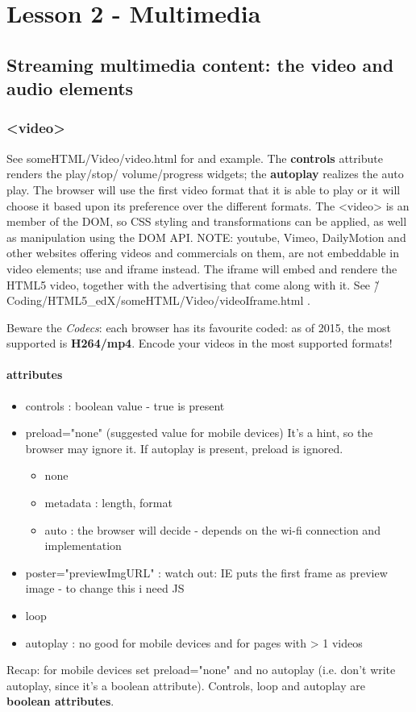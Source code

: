 \documentclass[a4paper,11pt]{book}
\begin{document}
\chapter{Lesson 2 - Multimedia}
    \section{Streaming multimedia content: the video and audio elements}
        \subsection{<video>}
        See someHTML/Video/video.html for and example. The \textbf{controls} attribute renders the play/stop/
        volume/progress widgets; the \textbf{autoplay} realizes the auto play. The browser will use the first
        video format that it is able to play or it will choose it based upon its preference over the different
        formats. The <video> is an member of the DOM, so CSS styling and transformations can be applied, as well
        as manipulation using the DOM API. NOTE: youtube, Vimeo, DailyMotion and other websites offering videos
        and commercials on them, are not embeddable in video elements; use and iframe instead. The iframe will
        embed and rendere the HTML5 video, together with the advertising that come along with it. See
        \~/Coding/HTML5\_edX/someHTML/Video/videoIframe.html .

        Beware the \emph{Codecs}: each browser has its favourite coded: as of 2015, the most supported is \textbf{H264/mp4}.
        Encode your videos in the most supported formats!
        \subsubsection{attributes}
        \begin{itemize}
            \item controls : boolean value - true is present
            \item preload="none" (suggested value for mobile devices)
                It's a hint, so the browser may ignore it. If autoplay is present, preload is ignored.
                \begin{itemize}
                    \item none
                    \item metadata : length, format
                    \item auto : the browser will decide - depends on the wi-fi connection and implementation
                \end{itemize}
            \item poster="previewImgURL" : watch out: IE puts the first frame as preview image - to change this i need JS
            \item loop 
            \item autoplay : no good for mobile devices and for pages with > 1 videos
        \end{itemize}
        Recap: for mobile devices set preload="none" and no autoplay (i.e. don't write autoplay, since it's a boolean attribute).
        Controls, loop and autoplay are \textbf{boolean attributes}.
\end{document}

